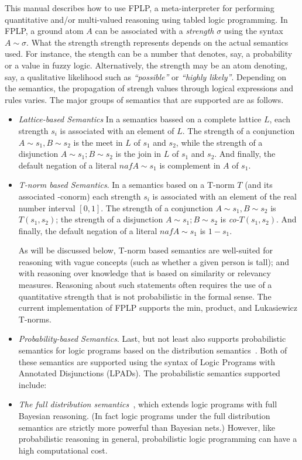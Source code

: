 
This  manual  describes  how  to  use  FPLP,  a  meta-interpreter  for
performing  quantitative and/or  multi-valued  reasoning using  tabled
logic programming.  In FPLP, a ground atom $A$ can be associated with
a {\em strength} $\sigma$ using  the syntax $A \sim \sigma$.  What the
strength  strength represents  depends on  the actual  semantics used.
For  instance,  the stength  can  be a  number  that  denotes, say,  a
probability or  a value in  fuzzy logic.  Alternatively,  the strength
may be  an atom denoting, say,  a qualitative likelihood  such as {\em
``possible''} or {\em ``highly likely''}.  Depending on the semantics,
the  propagation of  strengh  values through  logical expressions  and
rules varies.  The major groups of semantics that are supported are as
follows.

\begin{itemize}
\item {\em Lattice-based Semantics} In a semantics bassed on a
complete lattice $L$, each strength $s_i$ is associated with an
element of $L$.  The strength of a conjunction $A \sim s_1,B \sim s_2$
is the meet in $L$ of $s_1$ and $s_2$, while the strength of a
disjunction $A \sim s_1;B \sim s_2$ is the join in $L$ of $s_1$ and
$s_2$.  And finally, the default negation of a literal $naf{} A \sim
s_1$ is complement in $A$ of $s_1$.
%
\item {\em T-norm based Semantics}.  In a semantics based on a T-norm $T$
(and its associated -conorm) each strength $s_i$ is associated with an
element of the real number interval $[0,1]$.  The strength of a
conjunction $A\sim s_1,B\sim s_2$ is $T(s_1,s_2)$; the strength of a
disjunction $A\sim s_1;B\sim s_2$ is {\em co-}$T(s_1,s_2)$.  And
finally, the default negation of a literal $naf{} A\sim s_1$ is
 $1 - s_1$.

As will be discussed below, T-norm based semantics are well-suited for
reasoning with vague concepts (such as whether a given person is
tall); and with reasoning over knowledge that is based on similarity
or relevancy measures.  Reasoning about such statements often requires
the use of a quantitative strength that is not probabilistic in the
formal sense.  The current implementation of FPLP supports the min,
product, and Lukasiewicz T-norms.
%
\item {\em Probability-based Semantics}.  Last, but not
least \ourtool{} also supports probabilistic semantics for logic
programs based on the distribution semantics~\cite{}.  Both of these
semantics are supported using the syntax of Logic Programs with
Annotated Disjunctions (LPADs).  The probabilistic semantics supported
include: 
\bi
\item {\em The full distribution semantics~\cite{}}, which extends
logic programs with full Bayesian reasoning.  (In fact logic programs
under the full distribution semantics are strictly more powerful than
Bayesian nets.)  However, like probabilistic reasoning in general,
probabilistic logic programming can have a high computational cost.


\end{itemize}
